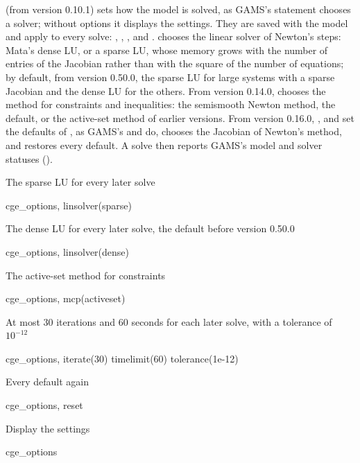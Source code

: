 

 (from version 0.10.1) sets how the model is solved, as
GAMS's  statement chooses a solver; without options it displays
the settings. They are saved with the model and apply to every solve:
, , ,
 and .  chooses the
linear solver of Newton's steps: Mata's dense LU, or a sparse LU, whose memory
grows with the number of entries of the Jacobian rather than with the square
of the number of equations; by default, from version 0.50.0, the sparse LU
for large systems with a sparse Jacobian and the dense LU for the others. From version 0.14.0,
 chooses the method for constraints and inequalities: the
semismooth Newton method, the default, or the active-set method of earlier
versions. From version 0.16.0, ,  and
 set the defaults of , as GAMS's
 and  do,  chooses the
Jacobian of Newton's method, and  restores every default. A
solve then reports GAMS's model and solver statuses
().


The sparse LU for every later solve
\begin{stcode}
cge_options, linsolver(sparse)
\end{stcode}
The dense LU for every later solve, the default before version 0.50.0
\begin{stcode}
cge_options, linsolver(dense)
\end{stcode}
The active-set method for constraints
\begin{stcode}
cge_options, mcp(activeset)
\end{stcode}
At most 30 iterations and 60 seconds for each later solve, with a tolerance of
$10^{-12}$
\begin{stcode}
cge_options, iterate(30) timelimit(60) tolerance(1e-12)
\end{stcode}
Every default again
\begin{stcode}
cge_options, reset
\end{stcode}
Display the settings
\begin{stcode}
cge_options
\end{stcode}


